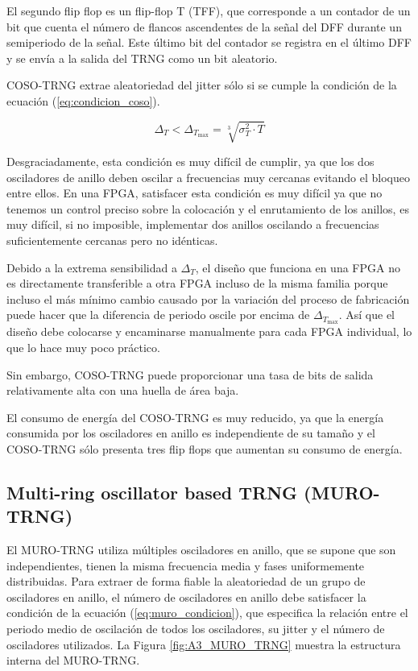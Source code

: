                El segundo flip flop es un flip-flop T (TFF), que corresponde a un contador de un bit que cuenta el número de flancos ascendentes de la señal del DFF durante un semiperiodo de la señal. Este último bit del contador se registra en el último DFF y se envía a la salida del TRNG como un bit aleatorio.

                COSO-TRNG extrae aleatoriedad del jitter sólo si se cumple la condición de la ecuación (\ref{eq:condicion_coso}).

                \begin{equation}
                    \Delta_{T} < \Delta_{T_{\text{max}}}  = \sqrt[3]{\sigma_{T}^{2} \cdot T}
                    \label{eq:condicion_coso}
                \end{equation}
	
                Desgraciadamente, esta condición es muy difícil de cumplir, ya que los dos osciladores de anillo deben oscilar a frecuencias muy cercanas evitando el bloqueo entre ellos. En una FPGA, satisfacer esta condición es muy difícil ya que no tenemos un control preciso sobre la colocación y el enrutamiento de los anillos, es muy difícil, si no imposible, implementar dos anillos oscilando a frecuencias suficientemente cercanas pero no idénticas.

                Debido a la extrema sensibilidad a $\Delta_{T}$, el diseño que funciona en una FPGA no es directamente transferible a otra FPGA incluso de la misma familia porque incluso el más mínimo cambio causado por la variación del proceso de fabricación puede hacer que la diferencia de periodo oscile por encima de $\Delta_{T_{\text{max}}} $.  Así que el diseño debe colocarse y encaminarse manualmente para cada FPGA individual, lo que lo hace muy poco práctico. 

                Sin embargo, COSO-TRNG puede proporcionar una tasa de bits de salida relativamente alta con una huella de área baja.

                El consumo de energía del COSO-TRNG es muy reducido, ya que la energía consumida por los osciladores en anillo es independiente de su tamaño y el COSO-TRNG sólo presenta tres flip flops que aumentan su consumo de energía.

		\subsection{Multi-ring oscillator based TRNG (MURO-TRNG)}

            El MURO-TRNG utiliza múltiples osciladores en anillo, que se supone que son independientes, tienen la misma frecuencia media y fases uniformemente distribuidas. Para extraer de forma fiable la aleatoriedad de un grupo de osciladores en anillo, el número de osciladores en anillo debe satisfacer la condición de la ecuación (\ref{eq:muro_condicion}), que especifica la relación entre el periodo medio de oscilación de todos los osciladores, su jitter y el número de osciladores utilizados. La Figura \ref{fig:A3_MURO_TRNG} muestra la estructura interna del MURO-TRNG.

